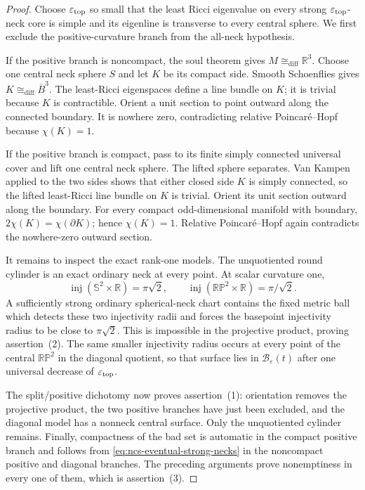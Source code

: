 \documentclass[10pt]{coll-l}
\newcommand{\Sph}{\mathbb{S}}
\newcommand{\diffeo}{\mathrel{\cong_{\mathrm{diff}}}}
\theoremstyle{definition}
\theoremstyle{remark}
\numberwithin{section}{chapter}
\numberwithin{equation}{chapter}
\begin{document}
\begin{proof}
Choose $\varepsilon_{\rm top}$ so small that the least Ricci eigenvalue on
every strong $\varepsilon_{\rm top}$-neck core is simple and its eigenline
is transverse to every central sphere.  We first exclude the
positive-curvature branch from the all-neck hypothesis.

If the positive branch is noncompact, the soul theorem gives
$M\diffeo\mathbb R^3$.  Choose one central neck sphere $S$ and let $K$ be
its compact side.  Smooth Schoenflies gives $K\diffeo\overline B^3$.  The
least-Ricci eigenspaces define a line bundle on $K$; it is trivial because
$K$ is contractible.  Orient a unit section to point outward along the
connected boundary.  It is nowhere zero, contradicting relative
Poincar\'e--Hopf because $\chi(K)=1$.

If the positive branch is compact, pass to its finite simply connected
universal cover and lift one central neck sphere.  The lifted sphere
separates.  Van Kampen applied to the two sides shows that either closed
side $K$ is simply connected, so the lifted least-Ricci line bundle on
$K$ is trivial.  Orient its unit section outward along the boundary.  For
every compact odd-dimensional manifold with boundary,
$2\chi(K)=\chi(\partial K)$; hence $\chi(K)=1$.  Relative
Poincar\'e--Hopf again contradicts the nowhere-zero outward section.

It remains to inspect the exact rank-one models.  The unquotiented round
cylinder is an exact ordinary neck at every point.  At scalar curvature
one,
\begin{equation}
 \operatorname{inj}(\Sph^2\times\mathbb R)=\pi\sqrt2,
 \qquad
 \operatorname{inj}(\mathbb{RP}^2\times\mathbb R)=\pi/\sqrt2. \label{eq:ncs-projective-injectivity-gap}
\end{equation}
A sufficiently strong ordinary spherical-neck chart contains the fixed
metric ball which detects these two injectivity radii and forces the
basepoint injectivity radius to be close to $\pi\sqrt2$.  This is
impossible in the projective product, proving assertion~(2).  The same
smaller injectivity radius occurs at every point of the central
$\mathbb{RP}^2$ in the diagonal quotient, so that surface lies in
$\mathscr B_\varepsilon(t)$ after one universal decrease of
$\varepsilon_{\rm top}$.

The split/positive dichotomy now proves assertion~(1): orientation removes
the projective product, the two positive branches have just been excluded,
and the diagonal model has a nonneck central surface.  Only the
unquotiented cylinder remains.  Finally, compactness of the bad set is
automatic in the compact positive branch and follows from
\eqref{eq:ncs-eventual-strong-necks} in the noncompact positive and
diagonal branches.  The preceding arguments prove nonemptiness in every
one of them, which is assertion~(3).
\end{proof}
\end{document}
